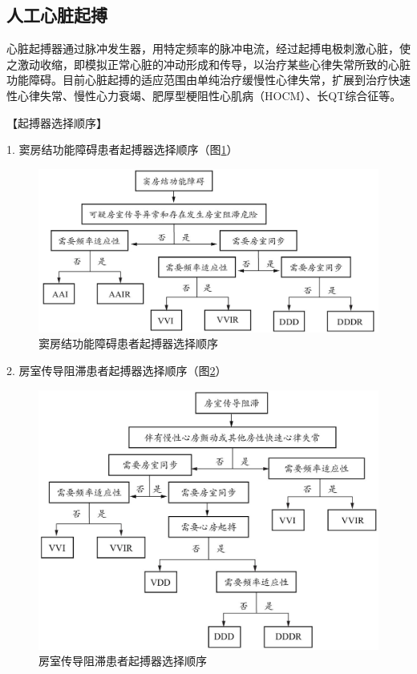 \subsection{人工心脏起搏}

心脏起搏器通过脉冲发生器，用特定频率的脉冲电流，经过起搏电极刺激心脏，使之激动收缩，即模拟正常心脏的冲动形成和传导，以治疗某些心律失常所致的心脏功能障碍。目前心脏起搏的适应范围由单纯治疗缓慢性心律失常，扩展到治疗快速性心律失常、慢性心力衰竭、肥厚型梗阻性心肌病（HOCM）、长QT综合征等。

【起搏器选择顺序】

1. 窦房结功能障碍患者起搏器选择顺序（图\ref{fig2-15-1}）

\begin{figure}[!htbp]
 \centering
 \includegraphics{./images/Image00083.jpg}
 \captionsetup{justification=centering}
 \caption{窦房结功能障碍患者起搏器选择顺序}
 \label{fig2-15-1}
  \end{figure} 

2. 房室传导阻滞患者起搏器选择顺序（图\ref{fig2-15-2}）

\begin{figure}[!htbp]
 \centering
 \includegraphics{./images/Image00084.jpg}
 \captionsetup{justification=centering}
 \caption{房室传导阻滞患者起搏器选择顺序}
 \label{fig2-15-2}
  \end{figure} 

